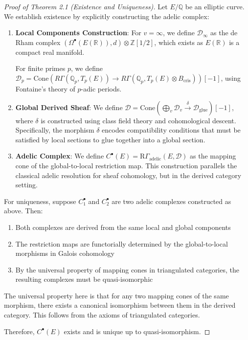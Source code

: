 \documentclass{article}
\theoremstyle{plain}
\theoremstyle{definition}
\theoremstyle{remark}
\begin{document}
\begin{proof}[Proof of Theorem 2.1 (Existence and Uniqueness)]
Let $E/\mathbb{Q}$ be an elliptic curve. We establish existence by explicitly constructing the adelic complex:

\begin{enumerate}
\item \textbf{Local Components Construction}:
   For $v = \infty$, we define $\mathcal{D}_{\infty}$ as the de Rham complex $(\Omega^{\bullet}(E(\mathbb{R})), d) \otimes \mathbb{Z}[1/2]$, which exists as $E(\mathbb{R})$ is a compact real manifold.

   For finite primes $p$, we define $\mathcal{D}_p = \text{Cone}(R\Gamma(\mathbb{Q}_p, T_p(E)) \to R\Gamma(\mathbb{Q}_p, T_p(E) \otimes B_{\text{cris}}))[-1]$, using Fontaine's theory of $p$-adic periods.

\item \textbf{Global Derived Sheaf}: 
   We define $\mathcal{D} = \text{Cone}(\bigoplus_v \mathcal{D}_v \stackrel{\delta}{\to} \mathcal{D}_{\text{glue}})[-1]$, where $\delta$ is constructed using class field theory and cohomological descent. Specifically, the morphism $\delta$ encodes compatibility conditions that must be satisfied by local sections to glue together into a global section.

\item \textbf{Adelic Complex}:
   We define $C^{\bullet}(E) = \text{R}\Gamma_{\text{adelic}}(E, \mathcal{D})$ as the mapping cone of the global-to-local restriction map. This construction parallels the classical adelic resolution for sheaf cohomology, but in the derived category setting.
\end{enumerate}
\clearpage
For uniqueness, suppose $C_1^{\bullet}$ and $C_2^{\bullet}$ are two adelic complexes constructed as above. Then:
\begin{enumerate}
\item Both complexes are derived from the same local and global components
\item The restriction maps are functorially determined by the global-to-local morphisms in Galois cohomology
\item By the universal property of mapping cones in triangulated categories, the resulting complexes must be quasi-isomorphic
\end{enumerate}

The universal property here is that for any two mapping cones of the same morphism, there exists a canonical isomorphism between them in the derived category. This follows from the axioms of triangulated categories.

Therefore, $C^{\bullet}(E)$ exists and is unique up to quasi-isomorphism.
\end{proof}
\end{document}
